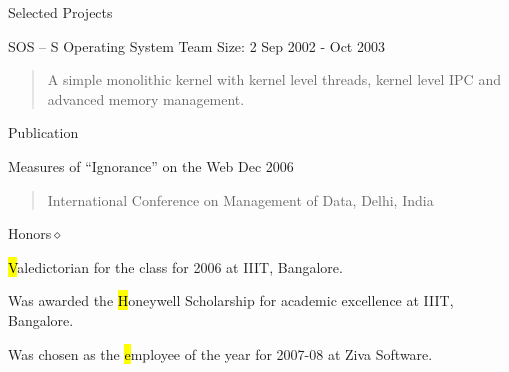 \documentclass{resume}
\newcommand{\teamsize}{\hfill\sc\footnotesize Team Size: }
\begin{document}
\begin{category}{Selected Projects}{}
    \item {\topic SOS -- S Operating System}
        {\teamsize 2}
        {\period Sep 2002 - Oct 2003}
        \begin{quote}
            A simple monolithic kernel with kernel level threads, kernel level
            IPC and advanced memory management.
        \end{quote}

\end{category}


\begin{category}{Publication}{}

    \item {\topic Measures of ``Ignorance'' on the Web}
        {\period Dec 2006}
        \begin{quote}
            International Conference on Management of Data, Delhi, India
        \end{quote}

\end{category}


\begin{category}{Honors}{$\diamond$}

    \item {\hl Valedictorian} for the class for 2006 at IIIT, Bangalore.

    \item Was awarded the {\hl Honeywell Scholarship} for academic excellence
        at IIIT, Bangalore.

    \item Was chosen as the {\hl employee of the year} for 2007-08 at Ziva
        Software.

\end{category}
\end{document}
